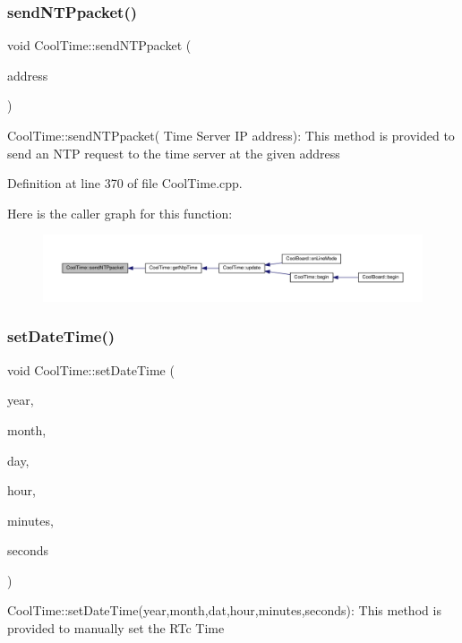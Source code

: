 \subsubsection{\texorpdfstring{send\+N\+T\+Ppacket()}{sendNTPpacket()}}
{\footnotesize\ttfamily void Cool\+Time\+::send\+N\+T\+Ppacket (\begin{DoxyParamCaption}\item[{I\+P\+Address \&}]{address }\end{DoxyParamCaption})}

Cool\+Time\+::send\+N\+T\+Ppacket( Time Server I\+P address)\+: This method is provided to send an N\+TP request to the time server at the given address 

Definition at line 370 of file Cool\+Time.\+cpp.

Here is the caller graph for this function\+:
\nopagebreak
\begin{figure}[H]
\begin{center}
\leavevmode
\includegraphics[width=350pt]{class_cool_time_a236a38d120dc53bc67456d763838c5a1_icgraph}
\end{center}
\end{figure}
\mbox{\label{class_cool_time_ab81ea7fdaace111aa01cc1ec84c6d297}} 
\subsubsection{\texorpdfstring{set\+Date\+Time()}{setDateTime()}}
{\footnotesize\ttfamily void Cool\+Time\+::set\+Date\+Time (\begin{DoxyParamCaption}\item[{int}]{year,  }\item[{int}]{month,  }\item[{int}]{day,  }\item[{int}]{hour,  }\item[{int}]{minutes,  }\item[{int}]{seconds }\end{DoxyParamCaption})}

Cool\+Time\+::set\+Date\+Time(year,month,dat,hour,minutes,seconds)\+: This method is provided to manually set the R\+Tc Time 

